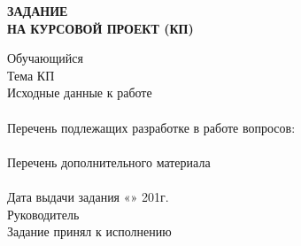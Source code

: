 \documentclass[a4paper,14pt]{extarticle}
\begin{document}
\newpage
\begin{center}
\textbf{ЗАДАНИЕ\\НА КУРСОВОЙ ПРОЕКТ (КП)}
\end{center}
\vspace{0.5cm}
\noindent Обучающийся \underline{\hspace{12.5cm}}\\[0.3cm]
Тема КП \underline{\hspace{13.7cm}}\\[0.3cm]
Исходные данные к работе \underline{\hspace{10.2cm}}\\
\underline{\hspace{16.5cm}}\\[0.3cm]
Перечень подлежащих разработке в работе вопросов: \underline{\hspace{5.5cm}}\\
\underline{\hspace{16.5cm}}\\[0.3cm]
Перечень дополнительного материала \underline{\hspace{8.2cm}}\\
\underline{\hspace{16.5cm}}\\[1cm]
Дата выдачи задания «\underline{\hspace{1cm}}» \underline{\hspace{4cm}} 201\underline{\hspace{0.5cm}}г.\\[0.5cm]
Руководитель \underline{\hspace{7cm}}\\[0.5cm]
Задание принял к исполнению \underline{\hspace{5cm}}
\end{document}
